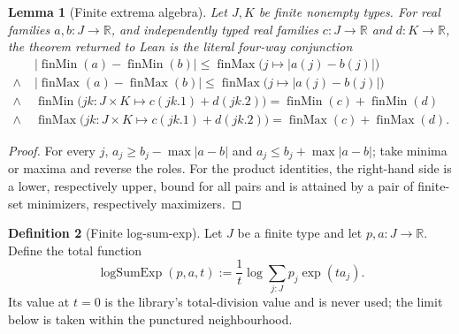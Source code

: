 \documentclass[9pt]{extarticle}
\newtheorem{lemma}{Lemma}[section]
\theoremstyle{definition}
\newtheorem{definition}[lemma]{Definition}
\theoremstyle{remark}
\newcommand{\R}{\mathbb R}
\newcommand{\abs}[1]{\left\lvert #1\right\rvert}
\begin{document}
\begin{lemma}[Finite extrema algebra]
\label{lem:fnd-finite-extrema}
Let $J,K$ be finite nonempty types.  For real families $a,b:J\to\R$,
and independently typed real families $c:J\to\R$ and $d:K\to\R$,
the theorem returned to Lean is the literal four-way conjunction
\begin{align*}
 &\abs{\operatorname{finMin}(a)-\operatorname{finMin}(b)}
   \leq \operatorname{finMax}
      \bigl(j\mapsto\abs{a(j)-b(j)}\bigr)\\
 {}\wedge{}\;&
 \abs{\operatorname{finMax}(a)-\operatorname{finMax}(b)}
   \leq \operatorname{finMax}
      \bigl(j\mapsto\abs{a(j)-b(j)}\bigr)\\
 {}\wedge{}\;&
 \operatorname{finMin}
   \bigl(jk:J\times K\mapsto c(jk.1)+d(jk.2)\bigr)
 =\operatorname{finMin}(c)+\operatorname{finMin}(d)\\
 {}\wedge{}\;&
 \operatorname{finMax}
   \bigl(jk:J\times K\mapsto c(jk.1)+d(jk.2)\bigr)
 =\operatorname{finMax}(c)+\operatorname{finMax}(d).
\end{align*}
\end{lemma}

\begin{proof}
For every $j$, $a_j\geq b_j-\max\abs{a-b}$ and
$a_j\leq b_j+\max\abs{a-b}$; take minima or maxima and reverse the roles.
For the product identities, the right-hand side is a lower, respectively
upper, bound for all pairs and is attained by a pair of finite-set
minimizers, respectively maximizers.
\end{proof}

\begin{definition}[Finite log-sum-exp]
\label{def:fnd-log-sum-exp}
Let $J$ be a finite type and let $p,a:J\to\R$.  Define the total function
\[
 \operatorname{logSumExp}(p,a,t):=
 \frac1t\log\sum_{j:J}p_j\exp(t a_j).
\]
Its value at $t=0$ is the library's total-division value and is never used;
the limit below is taken within the punctured neighbourhood.
\end{definition}
\end{document}
